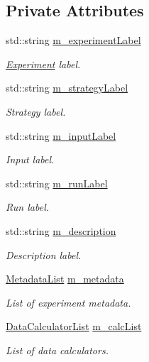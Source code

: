 \subsection*{Private Attributes}
\begin{DoxyCompactItemize}
\item 
std\+::string \hyperlink{classns3_1_1DataCollector_a42c9a3508fea2108614068e5c0b4abf1}{m\+\_\+experiment\+Label}
\begin{DoxyCompactList}\small\item\em \hyperlink{classExperiment}{Experiment} label. \end{DoxyCompactList}\item 
std\+::string \hyperlink{classns3_1_1DataCollector_a119ba3897f8e363cd6ee69fca2a8b661}{m\+\_\+strategy\+Label}
\begin{DoxyCompactList}\small\item\em Strategy label. \end{DoxyCompactList}\item 
std\+::string \hyperlink{classns3_1_1DataCollector_a5315c1fced751d57731b7b82cb933d7e}{m\+\_\+input\+Label}
\begin{DoxyCompactList}\small\item\em Input label. \end{DoxyCompactList}\item 
std\+::string \hyperlink{classns3_1_1DataCollector_ada0bf58bdd45ab87266be3ac5bedf936}{m\+\_\+run\+Label}
\begin{DoxyCompactList}\small\item\em Run label. \end{DoxyCompactList}\item 
std\+::string \hyperlink{classns3_1_1DataCollector_a4cfaabd5ffe20981f4d81a6f4fef30ed}{m\+\_\+description}
\begin{DoxyCompactList}\small\item\em Description label. \end{DoxyCompactList}\item 
\hyperlink{namespacens3_a6b8f3e2afae01465bf2e0062290d0ee9}{Metadata\+List} \hyperlink{classns3_1_1DataCollector_ab0af5b7cb49b181983ef92d9a8cc2f4c}{m\+\_\+metadata}
\begin{DoxyCompactList}\small\item\em List of experiment metadata. \end{DoxyCompactList}\item 
\hyperlink{namespacens3_a4ae834d03a85967043755b48477387f8}{Data\+Calculator\+List} \hyperlink{classns3_1_1DataCollector_a47a2c5ba78672189a38507db432effc0}{m\+\_\+calc\+List}
\begin{DoxyCompactList}\small\item\em List of data calculators. \end{DoxyCompactList}\end{DoxyCompactItemize}
